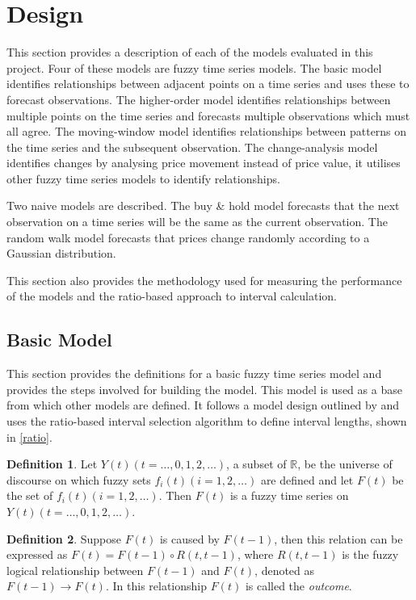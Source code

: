 \documentclass[12pt, oneside, a4paper]{article}
\theoremstyle{definition}
\newtheorem{ftsdef}{Definition}
\begin{document}
\section{Design}

\label{design}

This section provides a description of each of the models evaluated in this project. Four of these models are fuzzy time series models. The basic model identifies relationships between adjacent points on a time series and uses these to forecast observations. The higher-order model identifies relationships between multiple points on the time series and forecasts multiple observations which must all agree. The moving-window model identifies relationships between patterns on the time series and the subsequent observation. The change-analysis model identifies changes by analysing price movement instead of price value, it utilises other fuzzy time series models to identify relationships. 

Two naive models are described. The buy \& hold model forecasts that the next observation on a time series will be the same as the current observation. The random walk model forecasts that prices change randomly according to a Gaussian distribution. 

This section also provides the methodology used for measuring the performance of the models and the ratio-based approach to interval calculation.

\subsection{Basic Model}
\label{fts-design}
This section provides the definitions for a basic fuzzy time series model and provides the steps involved for building the model. This model is used as a base from which other models are defined. It follows a model design outlined by \cite{chen1996forecasting} and uses the ratio-based interval selection algorithm to define interval lengths, shown in \cref{ratio}.

\begin{ftsdef}
\label{def1}
Let $Y(t)(t= \ldots,0,1,2, \ldots)$, a subset of $\mathbb{R}$, be the universe of discourse on which fuzzy sets $f_i(t)(i=1,2,\ldots)$ are defined and let $F(t)$ be the set of $f_i(t)(i=1,2,\ldots)$. Then $F(t)$ is a fuzzy time series on $Y(t)(t= \ldots,0,1,2, \ldots)$.
\end{ftsdef}

\begin{ftsdef}
\label{def2}
Suppose $F(t)$ is caused by $F(t-1)$, then this relation can be expressed as $F(t)=F(t-1) \circ R(t,t-1)$, where $R(t,t-1)$ is the fuzzy logical relationship between $F(t-1)$ and $F(t)$, denoted as $F(t-1) \rightarrow F(t)$. In this relationship $F(t)$ is called the \textit{outcome}.
\end{ftsdef}
\end{document}
